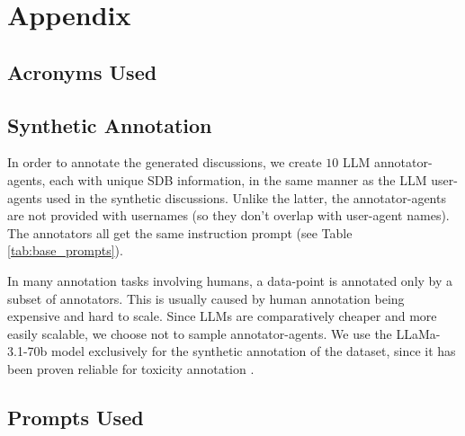 \section{Appendix}
\label{sec:appendix}

\subsection{Acronyms Used}

\begin{acronym}[WWW] %
\end{acronym}

\subsection{Synthetic Annotation}
\label{ssec:appendix:annotation}

In order to annotate the generated discussions, we create $10$ \ac{LLM} annotator-agents, each with unique \ac{SDB} information, in the same manner as the \ac{LLM} user-agents used in the synthetic discussions. Unlike the latter, the annotator-agents are not provided with usernames (so they don't overlap with user-agent names). The annotators all get the same instruction prompt (see Table \ref{tab:base_prompts}).

In many annotation tasks involving humans, a data-point is annotated only by a subset of annotators. This is usually caused by human annotation being expensive and hard to scale. Since \acp{LLM} are comparatively cheaper and more easily scalable, we choose not to sample annotator-agents. We use the LLaMa-3.1-70b model exclusively for the synthetic annotation of the dataset, since it has been proven reliable for toxicity annotation \cite{koh-etal-2024-llms}. 

\subsection{Prompts Used}
\label{ssec:appendix:prompts}


